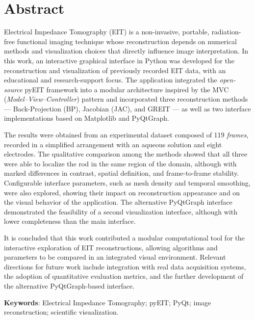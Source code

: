 
\chapter*{Abstract}

Electrical Impedance Tomography (EIT) is a non-invasive, portable, radiation-free functional imaging technique whose reconstruction depends on numerical methods and visualization choices that directly influence image interpretation. In this work, an interactive graphical interface in Python was developed for the reconstruction and visualization of previously recorded EIT data, with an educational and research-support focus. The application integrated the \textit{open-source} pyEIT framework into a modular architecture inspired by the MVC (\textit{Model--View--Controller}) pattern and incorporated three reconstruction methods --- Back-Projection (BP), Jacobian (JAC), and GREIT --- as well as two interface implementations based on Matplotlib and PyQtGraph.

The results were obtained from an experimental dataset composed of 119 \textit{frames}, recorded in a simplified arrangement with an aqueous solution and eight electrodes. The qualitative comparison among the methods showed that all three were able to localize the rod in the same region of the domain, although with marked differences in contrast, spatial definition, and frame-to-frame stability. Configurable interface parameters, such as mesh density and temporal smoothing, were also explored, showing their impact on reconstruction appearance and on the visual behavior of the application. The alternative PyQtGraph interface demonstrated the feasibility of a second visualization interface, although with lower completeness than the main interface.

It is concluded that this work contributed a modular computational tool for the interactive exploration of EIT reconstructions, allowing algorithms and parameters to be compared in an integrated visual environment. Relevant directions for future work include integration with real data acquisition systems, the adoption of quantitative evaluation metrics, and the further development of the alternative PyQtGraph-based interface.

\textbf{Keywords}: Electrical Impedance Tomography; pyEIT; PyQt; image reconstruction; scientific visualization.